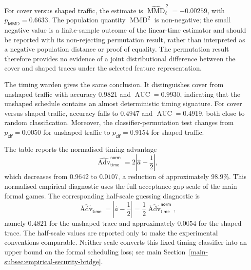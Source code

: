 \documentclass[journal]{IEEEtran}
\theoremstyle{definition}
\theoremstyle{game}
\begin{document}
For cover versus shaped traffic, the estimate is
$\widehat{\operatorname{MMD}}_{\ell}^{\,2}=-0.00259$, with
$p_{\mathsf{MMD}}=0.6633$. The population quantity
$\operatorname{MMD}^{2}$ is non-negative; the small negative value is
a finite-sample outcome of the linear-time estimator and should be
reported with its non-rejecting permutation result, rather than
interpreted as a negative population distance or proof of equality. The permutation result therefore
provides no evidence of a joint distributional difference between the
cover and shaped traces under the selected feature representation.

The timing warden gives the same conclusion. It distinguishes cover
from unshaped traffic with accuracy $0.9821$ and
$\operatorname{AUC}=0.9930$, indicating that the unshaped schedule
contains an almost deterministic timing signature. For cover versus
shaped traffic, accuracy falls to $0.4947$ and
$\operatorname{AUC}=0.4919$, both close to random classification.
Moreover, the classifier-permutation test changes from
$p_{\mathsf{clf}}=0.0050$ for unshaped traffic to
$p_{\mathsf{clf}}=0.9154$ for shaped traffic.

The table reports the normalised timing advantage
\begin{equation}
\widehat{\operatorname{Adv}}_{\mathsf{time}}^{\mathsf{norm}}
=
2\left|
\widehat a-\frac{1}{2}
\right|,
\label{eq:supp_sched_norm_adv}
\end{equation}
which decreases from $0.9642$ to $0.0107$, a reduction of
approximately $98.9\%$. This normalised empirical diagnostic uses the
full acceptance-gap scale of the main formal games. The corresponding
half-scale guessing diagnostic is
\begin{equation}
\widehat{\operatorname{Adv}}_{\mathsf{time}}
=
\left|
\widehat a-\frac{1}{2}
\right|
=
\frac{1}{2}
\widehat{\operatorname{Adv}}_{\mathsf{time}}^{\mathsf{norm}},
\label{eq:supp_sched_half_adv}
\end{equation}
namely $0.4821$ for the unshaped trace and approximately $0.0054$
for the shaped trace. The half-scale values are reported only to make
the experimental conventions comparable. Neither scale converts this
fixed timing classifier into an upper bound on the formal scheduling loss;
see main Section~\ref{main-subsec:empirical-security-bridge}.
\end{document}
